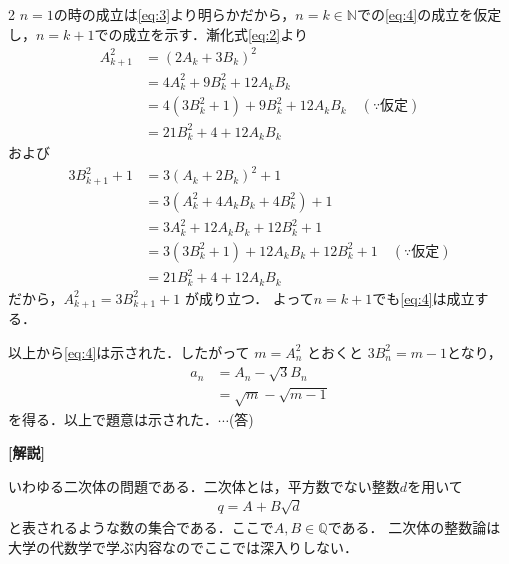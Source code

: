 \documentclass[../../main.tex]{subfiles}
\begin{document}
\begin{multicols}{2}
  $n=1$の時の成立は\cref{eq:3}より明らかだから，$n=k \in \mathbb{N}$での\cref{eq:4}の成立を仮定し，$n=k+1$での成立を示す．漸化式\cref{eq:2}より
  \begin{align}
    A_{k+1}^2
    & = (2A_k + 3B_k)^2                                      \\
    & = 4A_k^2 + 9B_k^2 + 12A_kB_k                           \\
    & = 4(3B_k^2 + 1) + 9B_k^2 + 12A_kB_k \quad (\text{∵仮定}) \\
    & = 21B_k^2 + 4 + 12A_kB_k
  \end{align}
  および
  \begin{align}
    3B_{k+1}^2 + 1
    & = 3(A_k + 2B_k)^2 + 1                                       \\
    & = 3(A_k^2 + 4A_kB_k + 4B_k^2) + 1                           \\
    & = 3A_k^2 + 12A_kB_k + 12B_k^2 + 1                           \\
    & = 3(3B_k^2 + 1) + 12A_kB_k + 12B_k^2 + 1 \quad (\text{∵仮定}) \\
    & = 21B_k^2 + 4 + 12A_kB_k
  \end{align}
  だから，$A_{k+1}^2 = 3B_{k+1}^2 + 1$ が成り立つ．
  よって$n=k+1$でも\cref{eq:4}は成立する．

  以上から\cref{eq:4}は示された．したがって
  $m=A_n^2$ とおくと $3B_n^2 = m-1$となり，
  \begin{align}
    a_n
    & = A_n - \sqrt{3} B_n    \\
    & = \sqrt{m} - \sqrt{m-1}
  \end{align}
  を得る．以上で題意は示された．$\cdots$(答)

  {\bf [解説]}

  いわゆる二次体の問題である．二次体とは，平方数でない整数$d$を用いて
  \begin{align}
    q = A + B\sqrt{d}
  \end{align}
  と表されるような数の集合である．ここで$A,B \in \mathbb{Q}$である．
  二次体の整数論は大学の代数学で学ぶ内容なのでここでは深入りしない．


\end{multicols}
\end{document}
